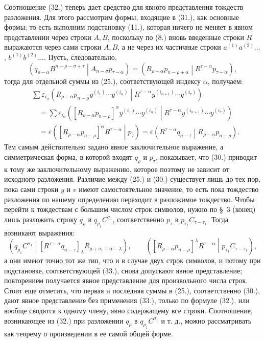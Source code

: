 \documentclass[11pt]{article}
\newcommand{\pair}[2]{\left(#1\middle|#2\right)}
\newcommand{\eps}{\varepsilon}
\begin{document}
Соотношение (32.) теперь дает средство для явного представления тождеств разложения. Для этого рассмотрим формы, входящие в (31.), как основные формы; то есть выполним подстановку (11.), которая ничего не меняет в явном представлении через строки $A,B$, поскольку по (8.) вновь введенные строки $R$ выражаются через сами строки $A,B$, а не через их частичные строки $a^{(1)}a^{(2)}\ldots$, $b^{(1)}b^{(2)}\ldots$. Пусть, следовательно,
\begin{equation}
 \pair{q_{\rho-\alpha}B^{n-\rho-\sigma+\tau}}{A_{n-\sigma}p_{\tau-\alpha}}
 =\pair{R_{\rho-\alpha}p_{n-\rho+\alpha}}{R^{\tau-\alpha}p_{\tau-\alpha}},
\tag{33}
\end{equation}
тогда для отдельной суммы из (25.), соответствующей индексу $\alpha$, получаем:
\begin{equation}
\begin{aligned}
&\sum \eps_{i_\alpha}
\pair{R_{\rho-\alpha}p_{n-\rho}y^{(i_1)}\cdots y^{(i_\alpha)}}
{R^{\tau-\alpha}y^{(i_{\alpha+1})}\cdots y^{(i_\tau)}}\\
&\quad=\sum \eps_{i_\alpha}
\pair{[R_{\rho-\alpha}p_{n-\rho}]^\alpha
y^{(i_1)}\cdots y^{(i_\alpha)}}
{R^{\tau-\alpha}y^{(i_{\alpha+1})}\cdots y^{(i_\tau)}}\\
&\quad=\eps\pair{[R_{\rho-\alpha}p_{n-\rho}]^\alpha R^{\tau-\alpha}}{p_\tau}
 =\eps\pair{R^{\tau-\alpha}q_{n-\tau}}{R_{\rho-\alpha}p_{n-\rho}}.
\end{aligned}
\tag{34}
\end{equation}
Тем самым действительно задано явное заключительное выражение, а симметрическая форма, в которой входят $q_\rho$ и $p_\tau$, показывает, что (30.) приводит к тому же заключительному выражению, которое поэтому не зависит от исходного разложения. Различие между (25.) и (30.) существует лишь до тех пор, пока сами строки $y$ и $v$ имеют самостоятельное значение, то есть пока тождество разложения по нашему определению переходит в разложимое тождество. Чтобы перейти к тождествам с большим числом строк символов, нужно по \S\ 3 (конец) лишь разложить строку $q_\rho$ в $q_{\rho_1}C^{\sigma_1}$, соответственно $p_\tau$ в $p_{\tau_1}C_{\tau-\tau_1}$. Тогда возникают выражения:
\begin{equation}
 \pair{q_{\rho_1}C^{\sigma_1}}
 {[R^{\tau-\alpha}q_{n-\tau}]_\lambda R_{\rho+\sigma_1-\alpha-\lambda}},
 \qquad
 \pair{[R_{\rho-\alpha}p_{n-\rho}]^\lambda R^{\tau-\alpha}}
 {p_{\tau_1}C_{\tau-\tau_1}},
\tag{35}
\end{equation}
а они имеют точно тот же тип, что и в случае двух строк символов, и потому при подстановке, соответствующей (33.), снова допускают явное представление; повторением получается явное представление для произвольного числа строк. Стоит еще отметить, что первая и последняя суммы в (25.), соответственно (30.), дают явное представление без применения (33.), только по формуле (32.), или вообще сводятся к одному члену, явно содержащему все строки. Соотношение, возникающее из (32.) при разложении $q_\rho$ в $q_{\rho_1}C^{\sigma_1}$ и т. д., можно рассматривать как теорему о произведении в ее самой общей форме.
\end{document}
